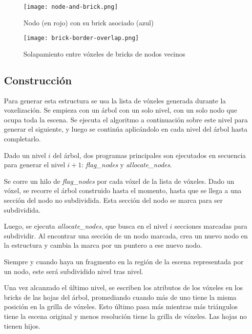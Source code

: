 \begin{figure}[h!]
    \centering
    \texttt{[image: node-and-brick.png]}
    \caption{Nodo (en rojo) con su brick asociado (azul)}
    \label{fig:node_and_brick}
\end{figure}

\begin{figure}[h!]
    \centering
    \texttt{[image: brick-border-overlap.png]}
    \caption{Solapamiento entre vóxeles de bricks de nodos vecinos}
    \label{fig:brick_border_overlap}
\end{figure}

\subsection{Construcción}\label{design:svo_construction}

Para generar esta estructura se usa la lista de vóxeles generada durante la voxelización.
Se empieza con un árbol con un solo nivel, con un solo nodo que ocupa toda la escena.
Se ejecuta el algoritmo a continuación sobre este nivel para generar el siguiente, y luego se continúa aplicándolo en cada nivel del árbol hasta completarlo.


Dado un nivel $i$ del árbol, dos programas principales son ejecutados en secuencia para generar el nivel $i + 1$: \textit{flag\_nodes} y \textit{allocate\_nodes}.

Se corre un hilo de \textit{flag\_nodes} por cada vóxel de la lista de vóxeles.
Dado un vóxel, se recorre el árbol construido hasta el momento, hasta que se llega a una sección del nodo no subdividida.
Esta sección del nodo se marca para ser subdividida.

Luego, se ejecuta \textit{allocate\_nodes}, que busca en el nivel $i$ secciones marcadas para subdividir.
Al encontrar una sección de un nodo marcada, crea un nuevo nodo en la estructura y cambia la marca por un puntero a ese nuevo nodo.

Siempre y cuando haya un fragmento en la región de la escena representada por un nodo, este será subdividido nivel tras nivel.

Una vez alcanzado el último nivel, se escriben los atributos de los vóxeles en los bricks de las hojas del árbol, promediando cuando más de uno tiene la misma posición en la grilla de vóxeles.
Esto último pasa más mientras más triángulos tiene la escena original y menos resolución tiene la grilla de vóxeles.
Las hojas no tienen hijos.

